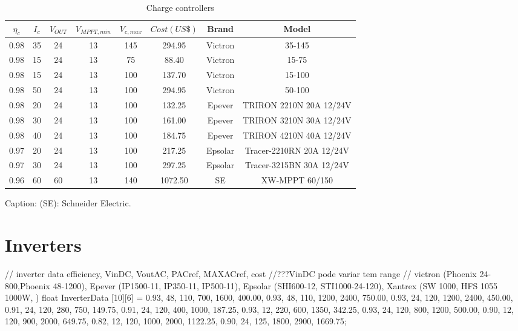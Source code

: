 \begin{table}
\caption{Charge controllers}\label{tab:charg}
\begin{scriptsize}
\begin{tabular}{|c|c|c|c|c|c|c|c|}
\hline
\hline
$\eta_{c}$ & $I_{c}$  & $V_{OUT}$ & $V_{MPPT,min}$  & $V_{c,max}$ & $Cost (US\$)$ & Brand & Model\\
\hline
\hline
0.98 & 35 & 24 & 13 & 145 & 294.95 & Victron & 35-145 \\
\hline
0.98 & 15 & 24 & 13 & 75 & 88.40 & Victron & 15-75 \\
\hline
0.98 & 15 & 24 & 13 & 100 & 137.70 & Victron & 15-100 \\
\hline
0.98 & 50 & 24 & 13 & 100 & 294.95 & Victron & 50-100 \\
\hline
0.98 & 20 & 24 & 13 & 100 & 132.25 & Epever & TRIRON 2210N 20A 12/24V \\
\hline
0.98 & 30 & 24 & 13 & 100 & 161.00 & Epever & TRIRON 3210N 30A 12/24V \\
\hline
0.98 & 40 & 24 & 13 & 100 & 184.75 & Epever & TRIRON 4210N 40A 12/24V \\
\hline
0.97 & 20 & 24 & 13 & 100 & 217.25 & Epsolar & Tracer-2210RN 20A 12/24V \\
\hline
0.97 & 30 & 24 & 13 & 100 & 297.25 & Epsolar & Tracer-3215BN 30A 12/24V \\
\hline
0.96 & 60 & 60 & 13 & 140 & 1072.50 & SE & XW-MPPT 60/150 \\
\hline
\hline
\end{tabular}
Caption: (SE): Schneider Electric.
\end{scriptsize}
\end{table}

\section{Inverters}
// inverter data  	{efficiency, VinDC, VoutAC, PACref, MAXACref, cost}   //???VinDC pode variar tem range
// victron (Phoenix 24-800,Phoenix 48-1200), Epever (IP1500-11,  IP350-11, IP500-11), Epsolar (SHI600-12, STI1000-24-120), Xantrex (SW 1000, HFS 1055 1000W, )
float InverterData [10][6] =   {{0.93, 48, 110, 700, 1600, 400.00},
			       {0.93, 48, 110, 1200, 2400, 750.00},
			       {0.93, 24, 120, 1200, 2400, 450.00},
			       {0.91, 24, 120, 280, 750, 149.75},
			       {0.91, 24, 120, 400, 1000, 187.25},
			       {0.93, 12, 220, 600, 1350, 342.25},
			       {0.93, 24, 120, 800, 1200, 500.00},
			       {0.90, 12, 120, 900, 2000, 649.75},
			       {0.82, 12, 120, 1000, 2000, 1122.25},
			       {0.90, 24, 125, 1800, 2900, 1669.75}};



